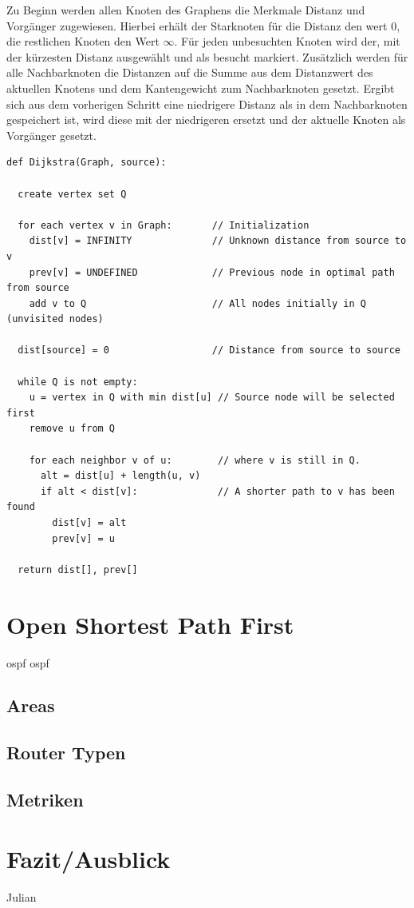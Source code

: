 \documentclass[1pt,a4paper,final]{article}
\begin{document}
Zu Beginn werden allen Knoten des Graphens die Merkmale Distanz und Vorgänger zugewiesen. Hierbei erhält der Starknoten für die Distanz den wert $0$, die restlichen Knoten den Wert $\infty$.
Für jeden unbesuchten Knoten wird der, mit der kürzesten Distanz ausgewählt und als besucht markiert.
Zusätzlich werden für alle Nachbarknoten die Distanzen auf die Summe aus dem Distanzwert des aktuellen Knotens und dem Kantengewicht zum Nachbarknoten gesetzt.
Ergibt sich aus dem vorherigen Schritt eine niedrigere Distanz als in dem Nachbarknoten gespeichert ist, wird diese mit der niedrigeren ersetzt und der aktuelle Knoten als Vorgänger gesetzt.\\
\begin{verbatim}
def Dijkstra(Graph, source):

  create vertex set Q
  
  for each vertex v in Graph:       // Initialization
    dist[v] = INFINITY              // Unknown distance from source to v
    prev[v] = UNDEFINED             // Previous node in optimal path from source
    add v to Q                      // All nodes initially in Q (unvisited nodes)

  dist[source] = 0                  // Distance from source to source      

  while Q is not empty:
    u = vertex in Q with min dist[u] // Source node will be selected first
    remove u from Q 

    for each neighbor v of u:        // where v is still in Q.
      alt = dist[u] + length(u, v)
      if alt < dist[v]:              // A shorter path to v has been found
        dist[v] = alt 
        prev[v] = u 
        
  return dist[], prev[]
\end{verbatim}

\section{Open Shortest Path First}
\ac{ospf} \ac{ospf}
\subsection{Areas}
\subsection{Router Typen}
\subsection{Metriken}
\section{Fazit/Ausblick}
Julian

\clearpage
\nocite{*}
\printbibliography
\end{document}
